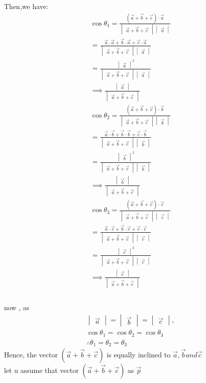 \documentclass{article}
\providecommand{\brak}[1]{\ensuremath{\left(#1\right)}}
\newcommand{\mydet}[1]{\ensuremath{\begin{vmatrix}#1\end{vmatrix}}}
\begin{document}
\begin{enumerate}
    Then,we have:\\
    \begin{align}
        \cos{\theta_1}= \frac{\brak{\vec{a}+\vec{b}+\vec{c}} \cdot \vec{a}}{\mydet{\vec{a}+\vec{b}+\vec{c}}\mydet{\vec{a}}}\\
        =\frac{\vec{a} \cdot \vec{a} + \vec{b} \cdot \vec{a} + \vec{c} \cdot \vec{a}}{\mydet{\vec{a}+\vec{b}+\vec{c}}\mydet{\vec{a}}}\\
        =\frac{\mydet{\vec{a}}^2}{\mydet{\vec{a}+\vec{b}+\vec{c}}\mydet{\vec{a}}} \\
        \implies \frac{\mydet{\vec{a}}}{\mydet{\vec{a}+\vec{b}+\vec{c}}}
        \\ \cos{\theta_2}= \frac{\brak{\vec{a}+\vec{b}+\vec{c}} \cdot \vec{b}}{\mydet{\vec{a}+\vec{b}+\vec{c}}\mydet{\vec{b}}}\\
        =\frac{\vec{a} \cdot \vec{b} + \vec{b} \cdot \vec{b} + \vec{c} \cdot \vec{b}}{\mydet{\vec{a}+\vec{b}+\vec{c}}\mydet{\vec{b}}}\\
        =\frac{\mydet{\vec{b}}^2}{\mydet{\vec{a}+\vec{b}+\vec{c}}\mydet{\vec{b}}} \\
        \implies \frac{\mydet{\vec{b}}}{\mydet{\vec{a}+\vec{b}+\vec{c}}}\\
        \cos{\theta_3}= \frac{\brak{\vec{a}+\vec{b}+\vec{c}} \cdot \vec{c}}{\mydet{\vec{a}+\vec{b}+\vec{c}}\mydet{\vec{c}}}\\
        =\frac{\vec{a} \cdot \vec{c} + \vec{b} \cdot \vec{c} + \vec{c} \cdot \vec{c}}{\mydet{\vec{a}+\vec{b}+\vec{c}}\mydet{\vec{c}}}\\
        =\frac{\mydet{\vec{c}}^2}{\mydet{\vec{a}+\vec{b}+\vec{c}}\mydet{\vec{c}}} \\
        \implies \frac{\mydet{\vec{c}}}{\mydet{\vec{a}+\vec{b}+\vec{c}}}\\
    \end{align}\\
    now , as \begin{align}
        \mydet{\vec{a}} = \mydet{\vec{b}} = \mydet{\vec{c}},\\\cos{\theta_1} = \cos{\theta_2} = \cos{\theta_3}\\
        \therefore \theta_1=\theta_2=\theta_3
    \end{align}
    Hence, the vector $\brak{\vec{a}+\vec{b}+\vec{c}}$ is equally inclined to $\vec{a},\vec{b} and \vec{c}$\\
    
    let u assume that vector $\brak{\vec{a}+\vec{b}+\vec{c}}$ as $\vec{p}$ \\


\end{enumerate}
\end{document}
